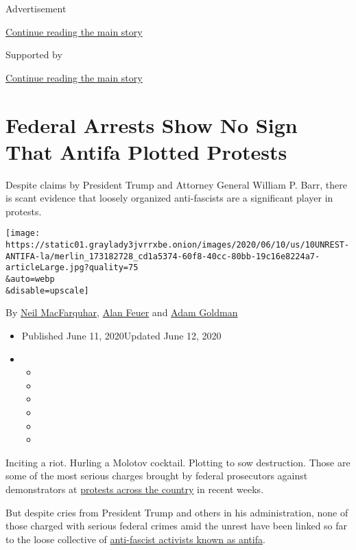 Advertisement

\protect\hyperlink{after-top}{Continue reading the main story}

Supported by

\protect\hyperlink{after-sponsor}{Continue reading the main story}

\hypertarget{federal-arrests-show-no-sign-that-antifa-plotted-protests}{%
\section{Federal Arrests Show No Sign That Antifa Plotted
Protests}\label{federal-arrests-show-no-sign-that-antifa-plotted-protests}}

Despite claims by President Trump and Attorney General William P. Barr,
there is scant evidence that loosely organized anti-fascists are a
significant player in protests.

\texttt{[image: https://static01.graylady3jvrrxbe.onion/images/2020/06/10/us/10UNREST-ANTIFA-la/merlin\_173182728\_cd1a5374-60f8-40cc-80bb-19c16e8224a7-articleLarge.jpg?quality=75\\\&auto=webp\\\&disable=upscale]}

By \href{https://www.nytimes3xbfgragh.onion/by/neil-macfarquhar}{Neil
MacFarquhar},
\href{https://www.nytimes3xbfgragh.onion/by/alan-feuer}{Alan Feuer} and
\href{https://www.nytimes3xbfgragh.onion/by/adam-goldman}{Adam Goldman}

\begin{itemize}
\item
  Published June 11, 2020Updated June 12, 2020
\item
  \begin{itemize}
  \item
  \item
  \item
  \item
  \item
  \item
  \end{itemize}
\end{itemize}

Inciting a riot. Hurling a Molotov cocktail. Plotting to sow
destruction. Those are some of the most serious charges brought by
federal prosecutors against demonstrators at
\href{https://www.nytimes3xbfgragh.onion/news-event/george-floyd-protests-minneapolis-new-york-los-angeles}{protests
across the country} in recent weeks.

But despite cries from President Trump and others in his administration,
none of those charged with serious federal crimes amid the unrest have
been linked so far to the loose collective of
\href{https://www.nytimes3xbfgragh.onion/article/what-antifa-trump.html}{anti-fascist
activists known as antifa}.

